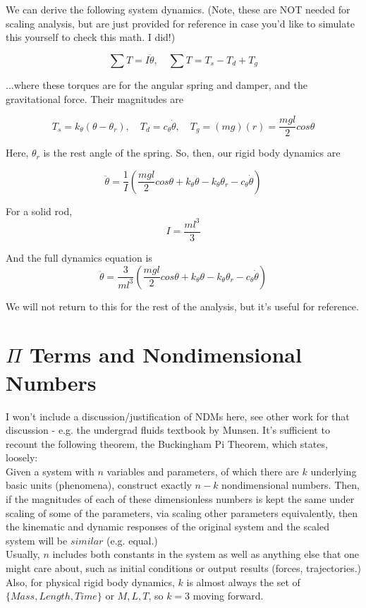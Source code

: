 \documentclass[12pt,letterpaper]{article}
\begin{document}
We can derive the following system dynamics. 
(Note, these are NOT needed for scaling analysis, but are just provided for reference in case you'd like to simulate this yourself to check this math. I did!)

\[
\sum T = I \ddot \theta, \quad \sum T = T_s - T_d + T_g
\]

...where these torques are for the angular spring and damper, and the gravitational force. Their magnitudes are

\[
T_s = k_{\theta}(\theta - \theta_r), \quad T_d = c_{\theta} \dot \theta, \quad T_g = (mg)(r) = \frac{mgl}{2} cos \theta
\]

Here, $\theta_r$ is the rest angle of the spring. So, then, our rigid body dynamics are

\[
\ddot \theta = \frac{1}{I} (\frac{mgl}{2} cos \theta + k_{\theta} \theta - k_{\theta} \theta_r - c_{\theta} \dot \theta )
\]

For a solid rod,
\[
I = \frac{m l^3}{3}
\]

And the full dynamics equation is
\[
\ddot \theta = \frac{3}{m l^3} (\frac{mgl}{2} cos \theta + k_{\theta} \theta - k_{\theta} \theta_r - c_{\theta} \dot \theta )
\]

We will not return to this for the rest of the analysis, but it's useful for reference.

\section{$\Pi$ Terms and Nondimensional Numbers}

I won't include a discussion/justification of NDMs here, see other work for that discussion - e.g. the undergrad fluids textbook by Munsen.
It's sufficient to recount the following theorem, the Buckingham Pi Theorem, which states, loosely: \\


Given a system with $n$ variables and parameters, of which there are $k$ underlying basic units (phenomena), construct exactly $n-k$ nondimensional numbers.
Then, if the magnitudes of each of these dimensionless numbers is kept the same under scaling of some of the parameters, via scaling other parameters equivalently, then the kinematic and dynamic responses of the original system and the scaled system will be $similar$ (e.g. equal.) \\


Usually, $n$ includes both constants in the system as well as anything else that one might care about, such as initial conditions or output results (forces, trajectories.)
Also, for physical rigid body dynamics, $k$ is almost always the set of $\{Mass, Length, Time\}$ or $M, L, T$, so $k=3$ moving forward.
\end{document}
